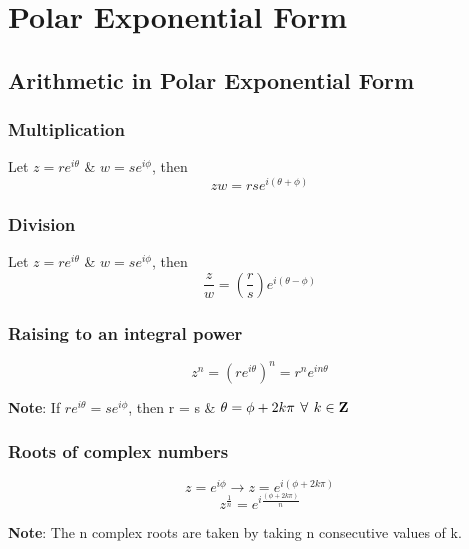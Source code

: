 \documentclass[oneside]{book}
\begin{document}
\section*{Polar Exponential Form}


\subsection*{Arithmetic in Polar Exponential Form}
\subsubsection*{Multiplication}
Let $z = re^{i\theta}$ \& $w = se^{i\phi}$, then 
\[
zw = rse^{i(\theta + \phi)}
\]
\subsubsection*{Division}
Let $z = re^{i\theta}$ \& $w = se^{i\phi}$, then 
\[
\frac{z}{w} = \left(\frac{r}{s}\right)e^{i(\theta - \phi)}
\]


\subsubsection*{Raising to an integral power}
\[
z^n = (re^{i\theta})^n = r^ne^{in\theta}
\]

\textbf{Note}: If $re^{i\theta} = se^{i\phi}$, then r = s \& $\theta = \phi + 2k\pi \hspace{0.4em} \forall \hspace{0.4em} k \in \mathbf{Z}$

\subsubsection*{Roots of complex numbers}
\[
z = e^{i\phi} \rightarrow z = e^{i(\phi + 2k\pi)}
\]
\[
z^{\frac{1}{n}} = e^{i\frac{(\phi + 2k\pi)}{n}}
\]

\textbf{Note}: The n complex roots are taken by taking n consecutive values of k.

\end{document}
